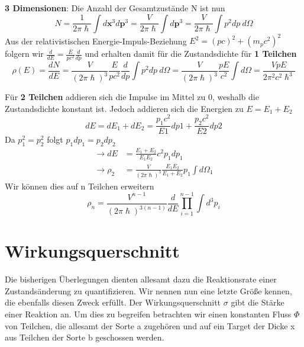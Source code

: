 \documentclass[Ex4_Zusammenfassung.tex]{subfiles}
\begin{document}
 \textbf{3 Dimensionen}: \newline
 Die Anzahl der Gesamtzustände N ist nun
 \begin{equation}
 N = \frac{1}{2 \pi \hslash} \int d\textbf{x}^3 d\textbf{p}^3 = \frac{V}{2 \pi \hslash} \int d\textbf{p}^3 = \frac{V}{2 \pi \hslash} \int p^2 dp \  d\Omega 
 \end{equation}
 Aus der relativistischen Energie-Impuls-Beziehung $ E^2 = (pc)^2 +  (m_pc^2)^2 $ folgern wir $ \frac{d}{dE} = \frac{E}{pc^2} \frac{d}{dp} $ und erhalten damit für die Zustandsdichte für \textbf{1 Teilchen}
 \begin{equation}
\rho(E) = \frac{dN}{dE} = \frac{V}{(2 \pi \hslash)^3}  \frac{E}{pc^2} \frac{d}{dp}  \int p^2 dp \  d\Omega =  \frac{V}{(2 \pi \hslash)^3} \frac{pE}{c^2} \int d\Omega = \frac{VpE}{2 \pi^2 c^2 \hslash^3}
\end{equation}

Für \textbf{2 Teilchen} addieren sich die Impulse im Mittel zu 0, weshalb die Zustandsdichte konstant ist. Jedoch addieren sich die Energien zu $ E = E_1 + E_2 $
\begin{equation}
dE = dE_1 + dE_2 = \frac{p_1c^2}{E1} dp1 + \frac{p_2c^2}{E2} dp2
\end {equation}
Da $ p_1^2 = p_2^2 $ folgt $  p_1 dp_{1} = p_2 dp_{2} $ 
\begin{align*}
\rightarrow  dE &= \frac{E_1 + E_2}{E_1E_2} c^2 p_1 dp_1  \\
\rightarrow  \rho_2 &=   \frac{V}{(2 \pi \hslash)^3} \frac{E_1E_2}{E_1+E_2} p_{1} \int d\Omega_{1}
\end{align*}
\newpage
Wir können dies auf n Teilchen erweitern
\begin{equation}
\rho_{n} = \frac{V^{n-1}}{(2 \pi \hslash)^{3(n-1)}} \frac{d}{dE} \prod_{i=1}^{n-1} \int d^3p_{i} 
\end{equation}

\section{Wirkungsquerschnitt}
Die bisherigen Überlegungen dienten allesamt dazu die Reaktionsrate einer Zustandsänderung zu quantifizieren. Wir nennen nun eine letzte Größe kennen, die ebenfalls diesen Zweck erfüllt.
Der Wirkungsquerschnitt $ \sigma $ gibt die Stärke einer Reaktion an. Um dies zu begreifen betrachten wir einen konstanten Fluss  $\Phi $ von Teilchen, die allesamt der Sorte a zugehören und auf ein Target der Dicke x aus Teilchen der Sorte b geschossen werden.  
\end{document}
